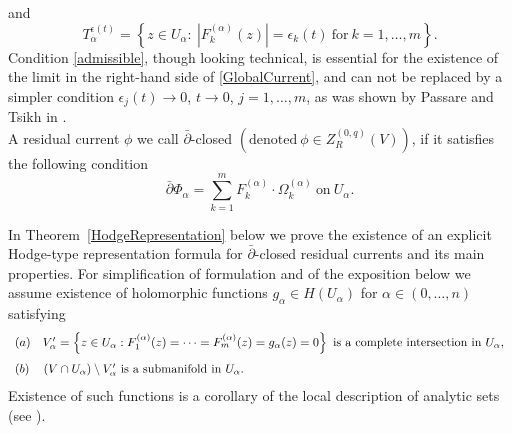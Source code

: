 \documentclass[11pt,reqno]{amsart}
\numberwithin{equation}{section}
\begin{document}
and
\begin{equation}\label{Tube}
T^{\epsilon(t)}_{\alpha}
=\left\{z\in U_{\alpha}:\ \left|F^{(\alpha)}_k(z)\right|=\epsilon_k(t)\ \text{for}\ k=1,\dots,m\right\}.
\end{equation}
Condition \eqref{admissible}, though looking technical, is essential for the existence of the limit
in the right-hand side of \eqref{GlobalCurrent}, and can not be replaced by a simpler condition
$\epsilon_j(t)\to 0$, $t\to 0$, $j=1,\ldots,m$, as was shown by Passare and Tsikh in \cite{PT}.\\
\indent
A residual current $\phi$ we call $\bar\partial$-closed
$\left(\text{denoted}\ \phi\in Z_R^{(0,q)}(V)\right)$, if it satisfies the following condition
\begin{equation}\label{Closed}
\bar\partial\Phi_{\alpha}
=\sum_{k=1}^mF^{(\alpha)}_k\cdot\Omega^{(\alpha)}_k\ \mbox{on}\ U_{\alpha}.
\end{equation}

\indent
In Theorem~\ref{HodgeRepresentation} below we prove the existence of an explicit
Hodge-type representation formula for $\bar\partial$-closed residual currents
and its main properties. For simplification of formulation
and of the exposition below we assume existence of holomorphic functions
$g_{\alpha}\in H(U_{\alpha})$ for $\alpha\in (0,\dots,n)$ satisfying
\begin{equation}\label{gFunctions}
\begin{array}{ll}
(a)\quad V^{\prime}_{\alpha}=\left\{z\in U_{\alpha}: F^{(\alpha)}_1(z)=\cdots=F^{(\alpha)}_m(z)
=g_{\alpha}(z)=0\right\}\ \text{is a complete intersection in}\ U_{\alpha},\vspace{0.1in}\\
(b)\quad \left(V\cap U_{\alpha}\right)\setminus V^{\prime}_{\alpha}\
\text{is a submanifold in}\ U_{\alpha}.
\end{array}\end{equation}
Existence of such functions is a corollary of the local description of analytic sets (see \cite{RS}).
\end{document}
